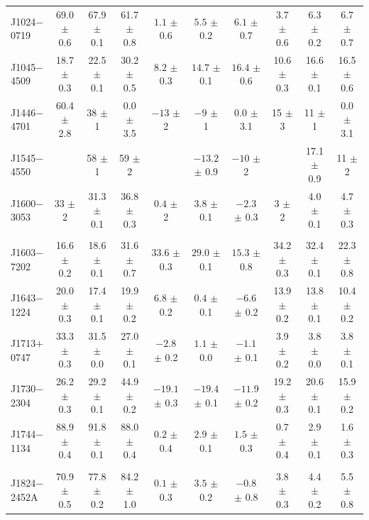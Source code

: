 \documentclass[useAMS,usenatbib]{mn2e}
\begin{document}
\begin{table}
\begin{center}
\begin{tabular}{lccccccccc}
J1024$-$0719& 69.0 $\pm$ 0.6& 67.9 $\pm $ 0.1& 61.7 $\pm$ 0.8&$ 1.1 $ $\pm$ 0.6 &$  5.5$ $\pm$ 0.2 &$ 6.1 $ $\pm$ 0.7 &  3.7 $\pm$ 0.6 &  6.3 $\pm$ 0.2 & 6.7  $\pm$ 0.7 \\
J1045$-$4509& 18.7 $\pm$ 0.3& 22.5 $\pm $ 0.1& 30.2 $\pm$ 0.5&$ 8.2 $ $\pm$ 0.3 &$ 14.7$ $\pm$ 0.1 &$ 16.4$ $\pm$ 0.6 & 10.6 $\pm$ 0.3 & 16.6 $\pm$ 0.1 & 16.5 $\pm$ 0.6 \\
J1446$-$4701& 60.4 $\pm$ 2.8& 38   $\pm $ 1  & 0.0  $\pm$ 3.5&$ -13 $ $\pm$ 2   &$ -9  $ $\pm$ 1   &$ 0.0 $ $\pm$ 3.1 &  15  $\pm$ 3   &   11 $\pm$ 1   & 0.0  $\pm$ 3.1 \\
J1545$-$4550&               & 58   $\pm $ 1  & 59   $\pm$ 2  &                  &$-13.2$ $\pm$ 0.9 &$ -10 $ $\pm$ 2   &                & 17.1 $\pm$ 0.9 & 11   $\pm$ 2 \\
J1600$-$3053& 33   $\pm$ 2  & 31.3 $\pm $ 0.1& 36.8 $\pm$ 0.3&$ 0.4 $ $\pm$ 2   &$  3.8$ $\pm$ 0.1 &$ -2.3$ $\pm$ 0.3 &    3 $\pm$ 2   &  4.0 $\pm$ 0.1 & 4.7  $\pm$ 0.3 \\
            &               &                &               &                  &                  &                  &                &                &       \\
J1603$-$7202& 16.6 $\pm$ 0.2& 18.6 $\pm $ 0.1& 31.6 $\pm$ 0.7&$33.6 $ $\pm$ 0.3 &$ 29.0$ $\pm$ 0.1 &$ 15.3$ $\pm$ 0.8 & 34.2 $\pm$ 0.3 & 32.4 $\pm$ 0.1 & 22.3 $\pm$ 0.8 \\
J1643$-$1224& 20.0 $\pm$ 0.3& 17.4 $\pm $ 0.1& 19.9 $\pm$ 0.2&$ 6.8 $ $\pm$ 0.2 &$  0.4$ $\pm$ 0.1 &$ -6.6$ $\pm$ 0.2 & 13.9 $\pm$ 0.2 & 13.8 $\pm$ 0.1 & 10.4 $\pm$ 0.2 \\
J1713$+$0747& 33.3 $\pm$ 0.3& 31.5 $\pm $ 0.0& 27.0 $\pm$ 0.1&$-2.8 $ $\pm$ 0.2 &$  1.1$ $\pm$ 0.0 &$ -1.1$ $\pm$ 0.1 &  3.9 $\pm$ 0.2 &  3.8 $\pm$ 0.0 & 3.8  $\pm$ 0.1 \\
J1730$-$2304& 26.2 $\pm$ 0.3& 29.2 $\pm $ 0.1& 44.9 $\pm$ 0.2&$-19.1$ $\pm$ 0.3 &$-19.4$ $\pm$ 0.1 &$-11.9$ $\pm$ 0.2 & 19.2 $\pm$ 0.3 & 20.6 $\pm$ 0.1 & 15.9 $\pm$ 0.2 \\
J1744$-$1134& 88.9 $\pm$ 0.4& 91.8 $\pm $ 0.1& 88.0 $\pm$ 0.4&$ 0.2 $ $\pm$ 0.4 &$  2.9$ $\pm$ 0.1 &$  1.5$ $\pm$ 0.3 &  0.7 $\pm$ 0.4 &  2.9 $\pm$ 0.1 & 1.6  $\pm$ 0.3 \\
            &               &                &               &                  &                  &                  &                &                &               \\
J1824$-$2452A& 70.9 $\pm$ 0.5& 77.8 $\pm $ 0.2& 84.2 $\pm$ 1.0&$ 0.1 $ $\pm$ 0.3 &$  3.5$ $\pm$ 0.2 &$ -0.8$ $\pm$ 0.8 &  3.8 $\pm$ 0.3 &  4.4 $\pm$ 0.2 & 5.5  $\pm$ 0.8 \\

\end{tabular}
\end{center}
\end{table}
\end{document}

